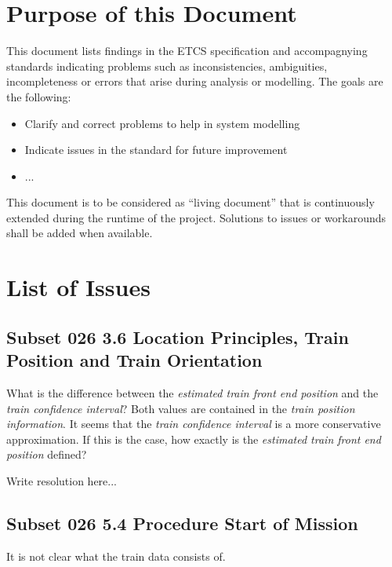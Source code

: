 \documentclass{template/openetcs_article}
\begin{document}
\tableofcontents
\newpage



\section{Purpose of this Document}

  This document lists findings in the ETCS specification and accompagnying standards indicating problems such as inconsistencies, ambiguities, incompleteness or errors that arise during analysis or modelling. The goals are the following:
  \begin{itemize}
    \item Clarify and correct problems to help in system modelling
    \item Indicate issues in the standard for future improvement
    \item ... 
  \end{itemize}

This document is to be considered as ``living document'' that is continuously extended during the runtime of the project. Solutions to issues or workarounds shall be added when available.

\section{List of Issues}

\subsection{Subset 026 3.6 Location Principles, Train Position and Train Orientation}

What is the difference between the \emph{estimated train front end position} and the \emph{train confidence interval}? Both values are contained in the \emph{train position information}. It seems that the \emph{train confidence interval} is a more conservative approximation. If this is the case, how exactly is the \emph{estimated train front end position} defined?

\resolution Write resolution here...

\subsection{Subset 026 5.4 Procedure Start of Mission}

It is not clear what the train data consists of.
\end{document}
